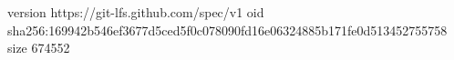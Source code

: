 version https://git-lfs.github.com/spec/v1
oid sha256:169942b546ef3677d5ced5f0c078090fd16e06324885b171fe0d513452755758
size 674552

